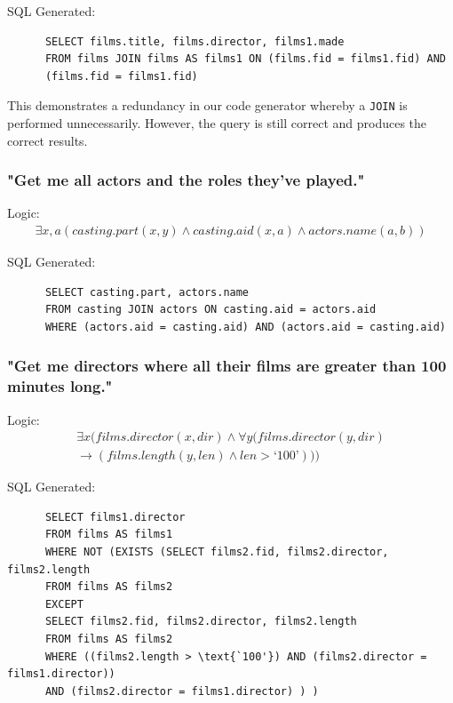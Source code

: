 \documentclass[a4paper, 11pt]{article}
\begin{document}
      SQL Generated:
      \begin{verbatim}
      SELECT films.title, films.director, films1.made
      FROM films JOIN films AS films1 ON (films.fid = films1.fid) AND
      (films.fid = films1.fid)
      \end{verbatim}

      This demonstrates a redundancy in our code generator whereby a
      \texttt{JOIN} is performed unnecessarily. However, the query is still
      correct and produces the correct results.

    \subsubsection*{"Get me all actors and the roles they've played."}

      Logic:
      \begin{gather}
        \exists x,a(casting.part(x, y) \land casting.aid(x, a) \land actors.name(a, b))
      \end{gather}

      SQL Generated:
      \begin{verbatim}
      SELECT casting.part, actors.name
      FROM casting JOIN actors ON casting.aid = actors.aid
      WHERE (actors.aid = casting.aid) AND (actors.aid = casting.aid)
      \end{verbatim}

    \subsubsection*{"Get me directors where all their films are greater than 100
      minutes long."}

      Logic:
      \begin{multline}
        \exists x(films.director(x, dir) \land \forall y(films.director(y, dir)
        \\
        \to (films.length(y, len) \land len > \text{`100'})))
      \end{multline}

      SQL Generated:
      \begin{verbatim}
      SELECT films1.director
      FROM films AS films1
      WHERE NOT (EXISTS (SELECT films2.fid, films2.director, films2.length
      FROM films AS films2
      EXCEPT
      SELECT films2.fid, films2.director, films2.length
      FROM films AS films2
      WHERE ((films2.length > \text{`100'}) AND (films2.director = films1.director))
      AND (films2.director = films1.director) ) )
      \end{verbatim}
\end{document}
